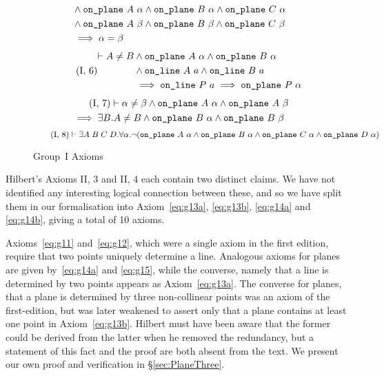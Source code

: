 \begin{figure}
\begin{equation}
\begin{split}
    &\wedge \code{on\_plane}\ A\ \alpha \wedge \code{on\_plane}\ B\ \alpha \wedge \code{on\_plane}\ C\ \alpha\\
    &\wedge \code{on\_plane}\ A\ \beta \wedge \code{on\_plane}\ B\ \beta \wedge \code{on\_plane}\ C\ \beta\\
    &\implies \alpha = \beta
  \end{split}
\end{equation}
\begin{equation}\label{eq:g16}
  \tag{I,~6}
  \begin{split}
    \vdash A \neq B &\wedge \code{on\_plane}\ A\ \alpha \wedge \code{on\_plane}\ B\ \alpha\\
    &\wedge \code{on\_line}\ A\ a \wedge \code{on\_line}\ B\ a\\
    &\implies \code{on\_line}\ P\ a \implies \code{on\_plane}\ P\ \alpha
  \end{split}
\end{equation}
\begin{multline}
\label{eq:g17}
  \tag{I,~7}
   \vdash\alpha \neq \beta \wedge \texttt{on\_plane}\ A\ \alpha \wedge \texttt{on\_plane}\ A\ \beta\\
   \implies \exists B. A \neq B \wedge \texttt{on\_plane}\ B\ \alpha \wedge \texttt{on\_plane}\ B\ \beta
\end{multline}
\begin{equation}
\label{eq:g18}
  \tag{I,~8}
  \vdash\exists A\;B\;C\;D. \forall \alpha. \neg(\code{on\_plane}\ A\ \alpha \wedge \code{on\_plane}\ B\ \alpha \wedge \code{on\_plane}\ C\ \alpha \wedge \code{on\_plane}\ D\ \alpha)
\end{equation}
\caption{Group~I Axioms}
\end{figure}\label{fig:Group1Axioms}

Hilbert's Axioms II, 3 and II, 4 each contain two distinct claims. We have not identified any interesting logical connection between these, and so we have split them in our formalisation into Axiom~\ref{eq:g13a}, \ref{eq:g13b}, \ref{eq:g14a} and \ref{eq:g14b}, giving a total of 10 axioms.

Axioms~\ref{eq:g11} and~\ref{eq:g12}, which were a single axiom in the first edition, require that two points uniquely determine a line. Analogous axioms for planes are given by~\ref{eq:g14a} and \ref{eq:g15}, while the converse, namely that a line is determined by two points appears as Axiom~\ref{eq:g13a}. The converse for planes, that a plane is determined by three non-collinear points was an axiom of the first-edition, but was later weakened to assert only that a plane contains at least one point in Axiom~\ref{eq:g13b}. Hilbert must have been aware that the former could be derived from the latter when he removed the redundancy, but a statement of this fact and the proof are both absent from the text. We present our own proof and verification in \S\ref{sec:PlaneThree}.

